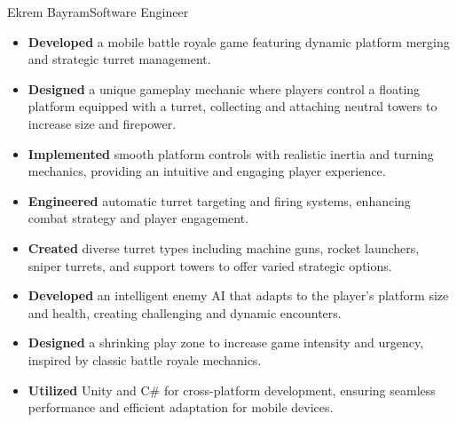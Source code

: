 \documentclass{article}
\begin{document}
\begin{cv}[avatar]{Ekrem Bayram}{Software Engineer}
    \cvseparator[2]
    \begin{cvevent}[2020]
        \begin{itemize}
            \item \textbf{Developed} a mobile battle royale game featuring dynamic platform merging and strategic turret management.
            \item \textbf{Designed} a unique gameplay mechanic where players control a floating platform equipped with a turret, collecting and attaching neutral towers to increase size and firepower.
            \item \textbf{Implemented} smooth platform controls with realistic inertia and turning mechanics, providing an intuitive and engaging player experience.
            \item \textbf{Engineered} automatic turret targeting and firing systems, enhancing combat strategy and player engagement.
            \item \textbf{Created} diverse turret types including machine guns, rocket launchers, sniper turrets, and support towers to offer varied strategic options.
            \item \textbf{Developed} an intelligent enemy AI that adapts to the player's platform size and health, creating challenging and dynamic encounters.
            \item \textbf{Designed} a shrinking play zone to increase game intensity and urgency, inspired by classic battle royale mechanics.
            \item \textbf{Utilized} Unity and C\# for cross-platform development, ensuring seamless performance and efficient adaptation for mobile devices.
        \end{itemize}
    \end{cvevent}


\end{cv}
\end{document}
